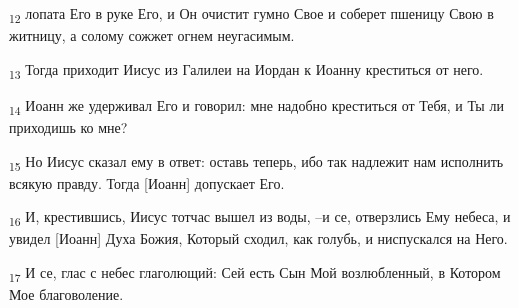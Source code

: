 \begin{tcolorbox}
\textsubscript{12} лопата Его в руке Его, и Он очистит гумно Свое и соберет пшеницу Свою в житницу, а солому сожжет огнем неугасимым.
\end{tcolorbox}
\begin{tcolorbox}
\textsubscript{13} Тогда приходит Иисус из Галилеи на Иордан к Иоанну креститься от него.
\end{tcolorbox}
\begin{tcolorbox}
\textsubscript{14} Иоанн же удерживал Его и говорил: мне надобно креститься от Тебя, и Ты ли приходишь ко мне?
\end{tcolorbox}
\begin{tcolorbox}
\textsubscript{15} Но Иисус сказал ему в ответ: оставь теперь, ибо так надлежит нам исполнить всякую правду. Тогда [Иоанн] допускает Его.
\end{tcolorbox}
\begin{tcolorbox}
\textsubscript{16} И, крестившись, Иисус тотчас вышел из воды, --и се, отверзлись Ему небеса, и увидел [Иоанн] Духа Божия, Который сходил, как голубь, и ниспускался на Него.
\end{tcolorbox}
\begin{tcolorbox}
\textsubscript{17} И се, глас с небес глаголющий: Сей есть Сын Мой возлюбленный, в Котором Мое благоволение.
\end{tcolorbox}
